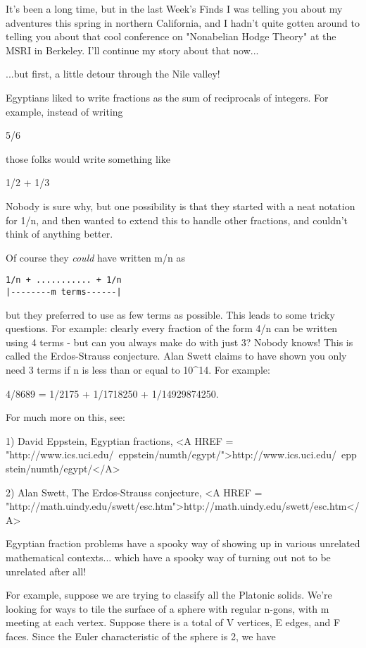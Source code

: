 

It's been a long time, but in the last Week's Finds I was telling you
about my adventures this spring in northern California, and I hadn't
quite gotten around to telling you about that cool conference on
"Nonabelian Hodge Theory" at the MSRI in Berkeley.  I'll continue my
story about that now...

...but first, a little detour through the Nile valley!  

Egyptians liked to write fractions as the sum of reciprocals of
integers.  For example, instead of writing 

5/6

those folks would write something like

1/2 + 1/3

Nobody is sure why, but one possibility is that they started with a 
neat notation for 1/n, and then wanted to extend this to handle other 
fractions, and couldn't think of anything better.

Of course they \emph{could} have written m/n as 

\begin{verbatim}
1/n + ........... + 1/n
|--------m terms------|
\end{verbatim}
    
but they preferred to use as few terms as possible.  This leads to some
tricky questions.  For example: clearly every fraction of the form 4/n
can be written using 4 terms - but can you always make do with just 3?
Nobody knows!  This is called the Erdos-Strauss conjecture.  Alan Swett
claims to have shown you only need 3 terms if n is less than or equal to 
10^{14}.  For example:

4/8689 = 1/2175 + 1/1718250 + 1/14929874250.

For much more on this, see:

1) David Eppstein, Egyptian fractions, 
<A HREF = "http://www.ics.uci.edu/~eppstein/numth/egypt/">http://www.ics.uci.edu/~eppstein/numth/egypt/</A>

2) Alan Swett, The Erdos-Strauss conjecture, <A HREF = "http://math.uindy.edu/swett/esc.htm">http://math.uindy.edu/swett/esc.htm</A>

Egyptian fraction problems have a spooky way of showing up in
various unrelated mathematical contexts... which have a spooky way 
of turning out not to be unrelated after all!

For example, suppose we are trying to classify all the Platonic
solids.  We're looking for ways to tile the surface of a sphere
with regular n-gons, with m meeting at each vertex.  Suppose there
is a total of V vertices, E edges, and F faces.  Since the Euler
characteristic of the sphere is 2, we have

